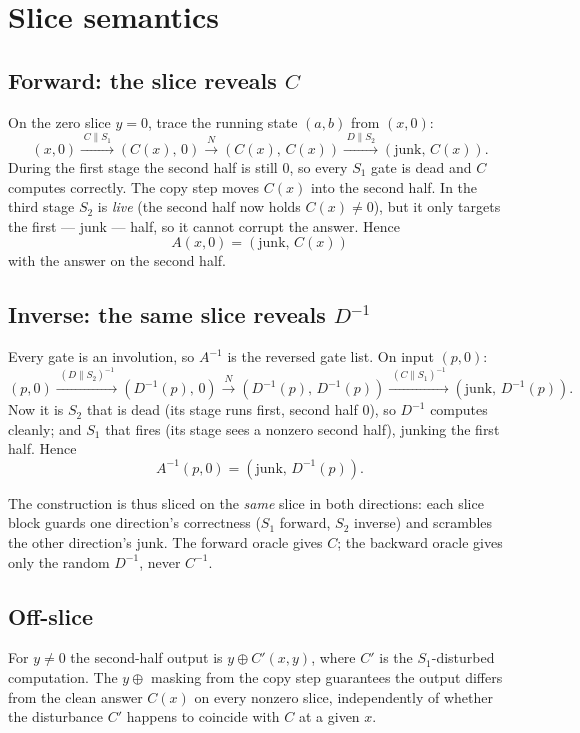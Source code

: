 \documentclass[11pt]{article}
\begin{document}
\section{Slice semantics}

\subsection{Forward: the slice reveals $C$}

On the zero slice $y=0$, trace the running state $(a,b)$ from $(x,0)$:
\[
(x,0)
\xrightarrow{\;C \parallel S_1\;} (C(x),\,0)
\xrightarrow{\;N\;} (C(x),\,C(x))
\xrightarrow{\;D \parallel S_2\;} (\text{junk},\,C(x)).
\]
During the first stage the second half is still $0$, so every $S_1$ gate is
dead and $C$ computes correctly. The copy step moves $C(x)$ into the second
half. In the third stage $S_2$ is \emph{live} (the second half now holds
$C(x)\neq 0$), but it only targets the first --- junk --- half, so it cannot
corrupt the answer. Hence
\[
\boxed{\,A(x,0) = (\text{junk},\, C(x))\,}
\]
with the answer on the second half.

\subsection{Inverse: the same slice reveals $D^{-1}$}

Every gate is an involution, so $A^{-1}$ is the reversed gate list. On input
$(p,0)$:
\[
(p,0)
\xrightarrow{\;(D \parallel S_2)^{-1}\;} (D^{-1}(p),\,0)
\xrightarrow{\;N\;} (D^{-1}(p),\,D^{-1}(p))
\xrightarrow{\;(C \parallel S_1)^{-1}\;} (\text{junk},\,D^{-1}(p)).
\]
Now it is $S_2$ that is dead (its stage runs first, second half $0$), so
$D^{-1}$ computes cleanly; and $S_1$ that fires (its stage sees a nonzero
second half), junking the first half. Hence
\[
\boxed{\,A^{-1}(p,0) = (\text{junk},\, D^{-1}(p)).\,}
\]

The construction is thus sliced on the \emph{same} slice in both directions:
each slice block guards one direction's correctness ($S_1$ forward, $S_2$
inverse) and scrambles the other direction's junk. The forward oracle gives
$C$; the backward oracle gives only the random $D^{-1}$, never $C^{-1}$.

\subsection{Off-slice}

For $y \neq 0$ the second-half output is $y \oplus C'(x,y)$, where $C'$ is the
$S_1$-disturbed computation. The $y\oplus$ masking from the copy step
guarantees the output differs from the clean answer $C(x)$ on every nonzero
slice, independently of whether the disturbance $C'$ happens to coincide with
$C$ at a given $x$.
\end{document}
